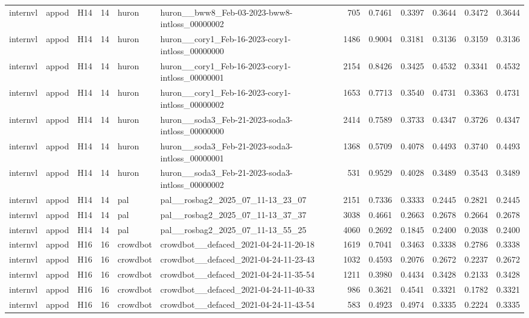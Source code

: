 \begin{table}[tbp]
\begin{tabular}{lllrllrrrrrr}
internvl & appod & H14 & 14 & huron & huron\_\_bww8\_Feb-03-2023-bww8-intloss\_00000002 & 705 & 0.7461 & 0.3397 & 0.3644 & 0.3472 & 0.3644 \\
internvl & appod & H14 & 14 & huron & huron\_\_cory1\_Feb-16-2023-cory1-intloss\_00000000 & 1486 & 0.9004 & 0.3181 & 0.3136 & 0.3159 & 0.3136 \\
internvl & appod & H14 & 14 & huron & huron\_\_cory1\_Feb-16-2023-cory1-intloss\_00000001 & 2154 & 0.8426 & 0.3425 & 0.4532 & 0.3341 & 0.4532 \\
internvl & appod & H14 & 14 & huron & huron\_\_cory1\_Feb-16-2023-cory1-intloss\_00000002 & 1653 & 0.7713 & 0.3540 & 0.4731 & 0.3363 & 0.4731 \\
internvl & appod & H14 & 14 & huron & huron\_\_soda3\_Feb-21-2023-soda3-intloss\_00000000 & 2414 & 0.7589 & 0.3733 & 0.4347 & 0.3726 & 0.4347 \\
internvl & appod & H14 & 14 & huron & huron\_\_soda3\_Feb-21-2023-soda3-intloss\_00000001 & 1368 & 0.5709 & 0.4078 & 0.4493 & 0.3740 & 0.4493 \\
internvl & appod & H14 & 14 & huron & huron\_\_soda3\_Feb-21-2023-soda3-intloss\_00000002 & 531 & 0.9529 & 0.4028 & 0.3489 & 0.3543 & 0.3489 \\
internvl & appod & H14 & 14 & pal & pal\_\_rosbag2\_2025\_07\_11-13\_23\_07 & 2151 & 0.7336 & 0.3333 & 0.2445 & 0.2821 & 0.2445 \\
internvl & appod & H14 & 14 & pal & pal\_\_rosbag2\_2025\_07\_11-13\_37\_37 & 3038 & 0.4661 & 0.2663 & 0.2678 & 0.2664 & 0.2678 \\
internvl & appod & H14 & 14 & pal & pal\_\_rosbag2\_2025\_07\_11-13\_55\_25 & 4060 & 0.2692 & 0.1845 & 0.2400 & 0.2038 & 0.2400 \\
internvl & appod & H16 & 16 & crowdbot & crowdbot\_\_defaced\_2021-04-24-11-20-18 & 1619 & 0.7041 & 0.3463 & 0.3338 & 0.2786 & 0.3338 \\
internvl & appod & H16 & 16 & crowdbot & crowdbot\_\_defaced\_2021-04-24-11-23-43 & 1032 & 0.4593 & 0.2076 & 0.2672 & 0.2237 & 0.2672 \\
internvl & appod & H16 & 16 & crowdbot & crowdbot\_\_defaced\_2021-04-24-11-35-54 & 1211 & 0.3980 & 0.4434 & 0.3428 & 0.2133 & 0.3428 \\
internvl & appod & H16 & 16 & crowdbot & crowdbot\_\_defaced\_2021-04-24-11-40-33 & 986 & 0.3621 & 0.4541 & 0.3321 & 0.1782 & 0.3321 \\
internvl & appod & H16 & 16 & crowdbot & crowdbot\_\_defaced\_2021-04-24-11-43-54 & 583 & 0.4923 & 0.4974 & 0.3335 & 0.2224 & 0.3335 \\

\end{tabular}
\end{table}
